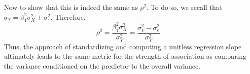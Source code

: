 Now to show that this is indeed the same as $\rho^2$. To do so, we recall that $\sigma_Y = \beta_1^2\sigma_X^2 + \sigma_{\epsilon}^2$. Therefore, 
\begin{equation}
\rho^2 = \frac{\beta_1^2 \sigma_X^2}{\sigma_Y^2} =  \frac{\sigma_Y^2 -\sigma_{\epsilon}^2 }{\sigma_Y^2}
\end{equation}
Thus, the approach of standardizing and computing a unitless regression slope ultimately leads to the same metric for the strength of association as comparing the variance conditioned on the predictor to the overall variance. 





%





%
%
%
